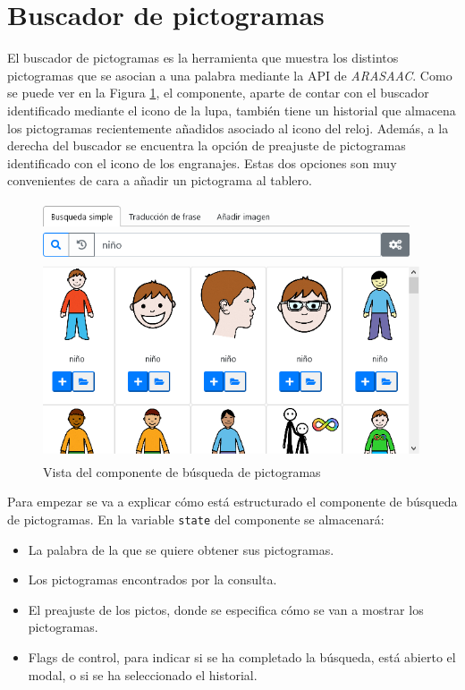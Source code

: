 

\section{Buscador de pictogramas}
\label{cap5:buscador}
El buscador de pictogramas es la herramienta que muestra los distintos pictogramas que se asocian a una palabra mediante la API de \textit{ARASAAC}. Como se puede ver en la Figura \ref{fig:buscarpicto2}, el componente, aparte de contar con el buscador identificado mediante el icono de la lupa, también tiene un historial que almacena los pictogramas recientemente añadidos asociado al icono del reloj. Además, a la derecha del buscador se encuentra la opción de preajuste de pictogramas identificado con el icono de los engranajes. Estas dos opciones son muy convenientes de cara a añadir un pictograma al tablero. 


\begin{figure}[h!]
	\centering
	\includegraphics[width=0.7\linewidth]{Imagenes/Bitmap/buscarPicto2}
	\caption{Vista del componente de búsqueda de pictogramas}
	\label{fig:buscarpicto2}
\end{figure}


Para empezar se va a explicar cómo está estructurado el componente de búsqueda de pictogramas. En la variable \texttt{state} del componente se almacenará:

\begin{itemize}
	\item La palabra de la que se quiere obtener sus pictogramas.
	\item Los pictogramas encontrados por la consulta.
	\item El preajuste de los pictos, donde se especifica cómo se van a mostrar los pictogramas.
	\item Flags de control, para indicar si se ha completado la búsqueda, está abierto el modal, o si se ha seleccionado el historial.     
\end{itemize}

